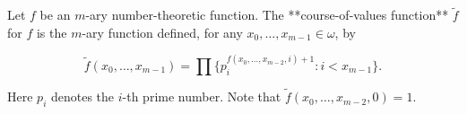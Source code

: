 Let $f$ be an $m$-ary number-theoretic function. The **course-of-values function** $\tilde{f}$ for $f$ is the $m$-ary function defined, for any $x_0, \ldots, x_{m-1} \in \omega$, by

$$\tilde{f}(x_0, \ldots, x_{m-1}) = \prod \{p_i^{f(x_0, \ldots, x_{m-2}, i)+1} : i < x_{m-1}\}.$$

Here $p_i$ denotes the $i$-th prime number. Note that $\tilde{f}(x_0, \ldots, x_{m-2}, 0) = 1$.
